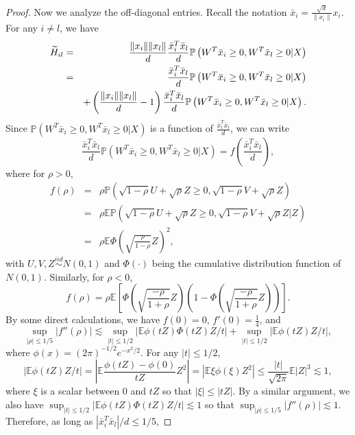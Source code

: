 \begin{proof}
Now we analyze the off-diagonal entries. Recall the notation $\bar{x}_i=\frac{\sqrt{d}}{\|x_i\|}x_i$. For any $i\neq l$, we have
\begin{eqnarray}
\nonumber \wt{H}_{il} &=& \frac{\|x_i\|\|x_l\|}{d}\frac{\bar{x}_i^T\bar{x}_l}{d}\mathbb{P}\left(W^T\bar{x}_i\geq 0, W^T\bar{x}_l\geq 0|X\right) \\
\label{eq:H-tilde-il-relu} &=& \frac{\bar{x}_i^T\bar{x}_l}{d}\mathbb{P}\left(W^T\bar{x}_i\geq 0, W^T\bar{x}_l\geq 0|X\right) \\
\nonumber && + \left(\frac{\|x_i\|\|x_l\|}{d}-1\right)\frac{\bar{x}_i^T\bar{x}_l}{d}\mathbb{P}\left(W^T\bar{x}_i\geq 0, W^T\bar{x}_l\geq 0|X\right).
\end{eqnarray}
Since $\mathbb{P}\left(W^T\bar{x}_i\geq 0, W^T\bar{x}_l\geq 0|X\right)$ is a function of $\frac{\bar{x}_i^T\bar{x}_l}{d}$, we can write
\begin{equation}
\frac{\bar{x}_i^T\bar{x}_l}{d}\mathbb{P}\left(W^T\bar{x}_i\geq 0, W^T\bar{x}_l\geq 0|X\right)=f\left(\frac{\bar{x}_i^T\bar{x}_l}{d}\right), \label{eq:f-H-tilde-relu}
\end{equation}
where for $\rho>0$,
\begin{eqnarray*}
f(\rho) &=& \rho\mathbb{P}\left(\sqrt{1-\rho}U+\sqrt{\rho}Z\geq 0, \sqrt{1-\rho}V+\sqrt{\rho}Z\right) \\
&=& \rho\mathbb{E}\mathbb{P}\left(\sqrt{1-\rho}U+\sqrt{\rho}Z\geq 0, \sqrt{1-\rho}V+\sqrt{\rho}Z|Z\right) \\
&=& \rho\mathbb{E}\Phi\left(\sqrt{\frac{\rho}{1-\rho}}Z\right)^2,
\end{eqnarray*}
with $U,V,Z\stackrel{iid}{\sim} N(0,1)$ and $\Phi(\cdot)$ being the cumulative distribution function of $N(0,1)$. Similarly, for $\rho<0$,
$$f(\rho) = \rho\mathbb{E}\left[\Phi\left(\sqrt{\frac{-\rho}{1+\rho}}Z\right)\left(1-\Phi\left(\sqrt{\frac{-\rho}{1+\rho}}Z\right)\right)\right].$$
By some direct calculations, we have $f(0)=0$, $f'(0)=\frac{1}{4}$, and
$$\sup_{|\rho|\leq 1/5}|f''(\rho)|\lesssim \sup_{|t|\leq 1/2}\left|\mathbb{E}\phi(tZ)\Phi(tZ)Z/t\right| + \sup_{|t|\leq 1/2}\left|\mathbb{E}\phi(tZ)Z/t\right|,$$
where $\phi(x)=(2\pi)^{-1/2}e^{-x^2/2}$. For any $|t|\leq 1/2$,
$$
\left|\mathbb{E}\phi(tZ)Z/t\right| = \left|\mathbb{E}\frac{\phi(tZ)-\phi(0)}{tZ}Z^2\right| = \left|\mathbb{E}\xi\phi(\xi)Z^2\right| \leq \frac{|t|}{\sqrt{2\pi}}\mathbb{E}|Z|^3\lesssim 1,
$$
where $\xi$ is a scalar between $0$ and $tZ$ so that $|\xi|\leq |tZ|$. By a similar argument, we also have $\sup_{|t|\leq 1/2}\left|\mathbb{E}\phi(tZ)\Phi(tZ)Z/t\right|\lesssim 1$ so that $\sup_{|\rho|\leq 1/5}|f''(\rho)|\lesssim 1$. Therefore, as long as $|\bar{x}_i^T\bar{x}_l|/d\leq 1/5$,

\end{proof}

